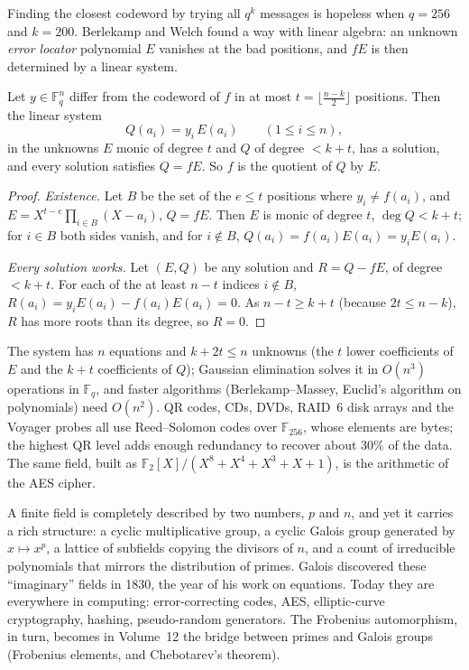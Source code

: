 Finding the closest codeword by trying all $q^k$ messages is hopeless when $q=256$ and $k=200$. Berlekamp and Welch found a way with linear algebra: an unknown \emph{error locator} polynomial $E$ vanishes at the bad positions, and $fE$ is then determined by a linear system.

\begin{theorem}\label{thm:bw}
Let $y\in\mathbb F_q^n$ differ from the codeword of $f$ in at most $t=\lfloor\frac{n-k}2\rfloor$ positions. Then the linear system
\[
Q(a_i)=y_i\,E(a_i)\qquad(1\le i\le n),
\]
in the unknowns $E$ monic of degree $t$ and $Q$ of degree $<k+t$, has a solution, and every solution satisfies $Q=fE$. So $f$ is the quotient of $Q$ by $E$.
\end{theorem}
\begin{proof}
\emph{Existence.} Let $B$ be the set of the $e\le t$ positions where $y_i\ne f(a_i)$, and $E=X^{t-e}\prod_{i\in B}(X-a_i)$, $Q=fE$. Then $E$ is monic of degree $t$, $\deg Q<k+t$; for $i\in B$ both sides vanish, and for $i\notin B$, $Q(a_i)=f(a_i)E(a_i)=y_iE(a_i)$.

\emph{Every solution works.} Let $(E,Q)$ be any solution and $R=Q-fE$, of degree $<k+t$. For each of the at least $n-t$ indices $i\notin B$, $R(a_i)=y_iE(a_i)-f(a_i)E(a_i)=0$. As $n-t\ge k+t$ (because $2t\le n-k$), $R$ has more roots than its degree, so $R=0$.
\end{proof}

The system has $n$ equations and $k+2t\le n$ unknowns (the $t$ lower coefficients of $E$ and the $k+t$ coefficients of $Q$); Gaussian elimination solves it in $O(n^3)$ operations in $\mathbb F_q$, and faster algorithms (Berlekamp--Massey, Euclid's algorithm on polynomials) need $O(n^2)$. QR codes, CDs, DVDs, RAID~6 disk arrays and the Voyager probes all use Reed--Solomon codes over $\mathbb F_{256}$, whose elements are bytes; the highest QR level adds enough redundancy to recover about $30\%$ of the data. The same field, built as $\mathbb F_2[X]/(X^8+X^4+X^3+X+1)$, is the arithmetic of the AES cipher.

\begin{beauty}
A finite field is completely described by two numbers, $p$ and $n$, and yet it carries a rich structure: a cyclic multiplicative group, a cyclic Galois group generated by $x\mapsto x^p$, a lattice of subfields copying the divisors of $n$, and a count of irreducible polynomials that mirrors the distribution of primes. Galois discovered these ``imaginary'' fields in 1830, the year of his work on equations. Today they are everywhere in computing: error-correcting codes, AES, elliptic-curve cryptography, hashing, pseudo-random generators. The Frobenius automorphism, in turn, becomes in Volume~12 the bridge between primes and Galois groups (Frobenius elements, and Chebotarev's theorem).
\end{beauty}


